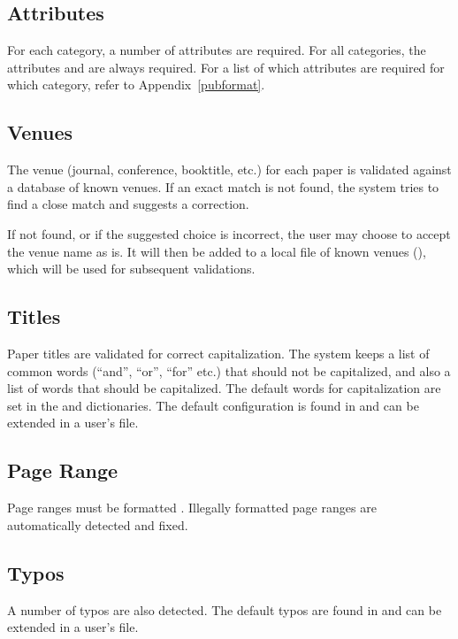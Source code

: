 \subsection{Attributes}

For each category, a number of attributes are required. For all
categories, the attributes  and  are always
required. For a list of which attributes are required for which
category, refer to Appendix~\ref{pubformat}.

\subsection{Venues}

The venue (journal, conference, booktitle, etc.) for each paper is
validated against a database of known venues. If an exact match is not
found, the system tries to find a close match and suggests a
correction.

If not found, or if the suggested choice is incorrect, the user may
choose to accept the venue name as is. It will then be added to a
local file of known venues (), which will be used for
subsequent validations.

\subsection{Titles}

Paper titles are validated for correct capitalization. The system
keeps a list of common words (``and'', ``or'', ``for'' etc.) that
should not be capitalized, and also a list of words that should be
capitalized. The default words for capitalization are set in the
 and  dictionaries. The default
configuration is found in
 and can be extended in a user's
 file.

\subsection{Page Range}

Page ranges must be formatted . Illegally formatted page
ranges are automatically detected and fixed.

\subsection{Typos}

A number of typos are also detected. The default typos are
found in  and can be extended in a user's
 file.
